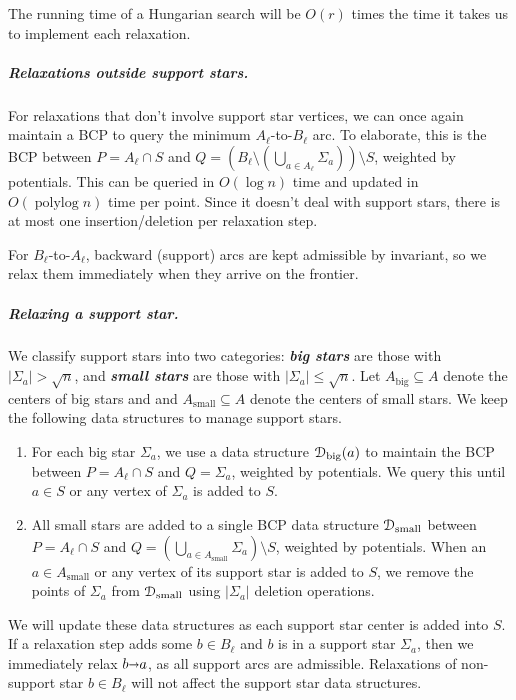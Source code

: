 \documentclass[a4paper,UKenglish]{socg-lipics-v2018}
\def\polylog{\mathop{\mathrm{polylog}}}
\def\abs#1{\mathopen| #1 \mathclose|}		%
\def\arcto{\mathord\shortrightarrow}
\def\arc#1#2{#1\arcto#2}
\theoremstyle{plain}
\numberwithin{figure}{section}
\renewcommand{\paragraph}{\subparagraph}
\def\EMPH#1{\textbf{\emph{\boldmath #1}}}
\begin{document}
The running time of a Hungarian search will be $O(r)$ times the time it takes
us to implement each relaxation.

\paragraph{Relaxations outside support stars.}
For relaxations that don't involve support star vertices, we can once again
maintain a BCP to query the minimum $A_\ell$-to-$B_\ell$ arc.
To elaborate, this is the BCP between $P = A_\ell \cap S$ and
$Q = (B_\ell \setminus (\bigcup_{a \in A_\ell} \Sigma_a)) \setminus S$,
weighted by potentials.
This can be queried in $O(\log n)$ time and updated in $O(\polylog n)$ time per
point.
Since it doesn't deal with support stars, there is at most one
insertion/deletion per relaxation step.

For $B_\ell$-to-$A_\ell$, backward (support) arcs are kept admissible by
invariant, so we relax them immediately when they arrive on the frontier.

\paragraph{Relaxing a support star.}
We classify support stars into two categories: \EMPH{big stars} are those with
$\abs{\Sigma_a} > \sqrt{n}$, and \EMPH{small stars} are those with
$\abs{\Sigma_a} \leq \sqrt{n}$.
Let $A_\text{big} \subseteq A$ denote the centers of big stars and
and $A_\text{small} \subseteq A$ denote the centers of small stars.
We keep the following data structures to manage support stars.
\begin{enumerate}
\item For each big star $\Sigma_a$, we use a data structure
	$\EuScript{D}_\text{big}(a)$ to maintain the BCP between
	$P = A_\ell \cap S$ and $Q = \Sigma_a$, weighted by potentials.
	We query this until $a \in S$ or any vertex of $\Sigma_a$ is added to
	$S$.
\item All small stars are added to a single BCP data structure
	$\EuScript{D}_\text{small}$ between $P = A_\ell \cap S$ and
	$Q = (\bigcup_{a \in A_\text{small}} \Sigma_a) \setminus S$, weighted by
	potentials.
	When an $a \in A_\text{small}$ or any vertex of its support star is
	added to $S$, we remove the points of $\Sigma_a$ from
	$\EuScript{D}_\text{small}$ using $\abs{\Sigma_a}$ deletion operations.
\end{enumerate}
We will update these data structures as each support star center is added into
$S$.
If a relaxation step adds some $b \in B_\ell$ and $b$ is in a support star
$\Sigma_a$, then we immediately relax $\arc ba$, as all support arcs are
admissible.
Relaxations of non-support star $b \in B_\ell$ will not affect the support star
data structures.
\end{document}
